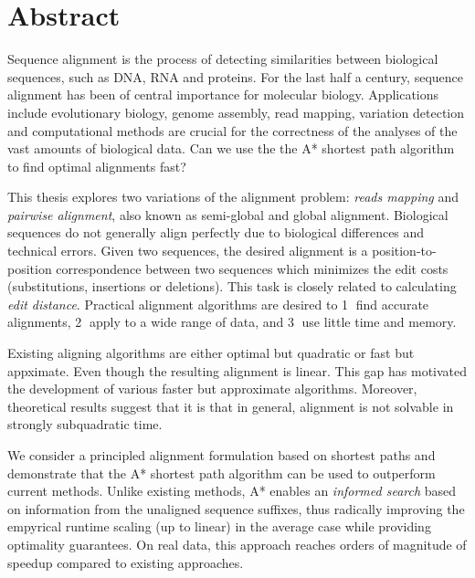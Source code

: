 \begingroup
\let\clearpage\relax
\let\cleardoublepage\relax
\let\cleardoublepage\relax

\chapter*{Abstract}

Sequence alignment is the process of detecting similarities between biological
sequences, such as DNA, RNA and proteins. For the last half a century, sequence
alignment has been of central importance for molecular biology. Applications
include evolutionary biology, genome assembly, read mapping, variation detection
and computational methods are crucial for the correctness of the analyses of the
vast amounts of biological data. Can we use the the A* shortest path algorithm
to find optimal alignments fast?

This thesis explores two variations of the alignment problem: \emph{reads
mapping} and \emph{pairwise alignment}, also known as semi-global and global
alignment. Biological sequences do not generally align perfectly due to
biological differences and technical errors. Given two sequences, the desired
alignment is a position-to-position correspondence between two sequences which
minimizes the edit costs (substitutions, insertions or deletions). This task is
closely related to calculating \emph{edit distance}. Practical alignment
algorithms are desired to \textcircled{1} find accurate alignments,
\textcircled{2} apply to a wide range of data, and \textcircled{3} use little
time and memory.

Existing aligning algorithms are either optimal but quadratic or fast but
appximate. Even though the resulting alignment is linear. This gap has motivated
the development of various faster but approximate algorithms. Moreover,
theoretical results suggest that it is that in general, alignment is not
solvable in strongly subquadratic time.

We consider a principled alignment formulation based on shortest paths and
demonstrate that the A* shortest path algorithm can be used to outperform
current methods. Unlike existing methods, A* enables an \emph{informed search}
based on information from the unaligned sequence suffixes, thus radically
improving the empyrical runtime scaling (up to linear) in the average case while
providing optimality guarantees. On real data, this approach reaches orders of
magnitude of speedup compared to existing approaches.

